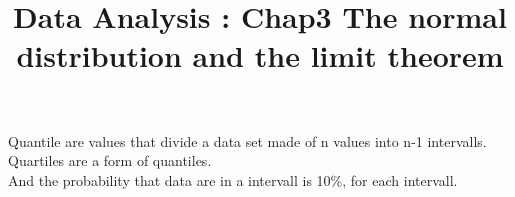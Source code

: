 \documentclass{article}
\title{Data Analysis : Chap3 The normal distribution and the limit theorem}
\begin{document}
Quantile are values that divide a data set made of n values into n-1 intervalls. Quartiles are a form of quantiles. \\ 
And the probability that data are in a intervall is 10\%, for each intervall.
\end{document}
